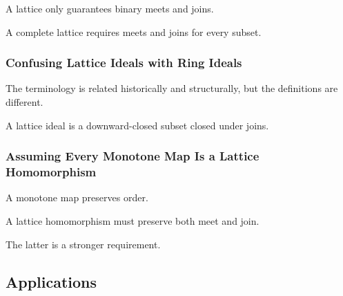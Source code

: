 A lattice only guarantees binary meets and joins.

A complete lattice requires meets and joins for every subset.

\subsubsection{Confusing Lattice Ideals with Ring Ideals}

The terminology is related historically and structurally, but the
definitions are different.

A lattice ideal is a downward-closed subset closed under joins.

\subsubsection{Assuming Every Monotone Map Is a Lattice Homomorphism}

A monotone map preserves order.

A lattice homomorphism must preserve both meet and join.

The latter is a stronger requirement.

\subsection{Applications}
\label{subsec:lattice-applications}

